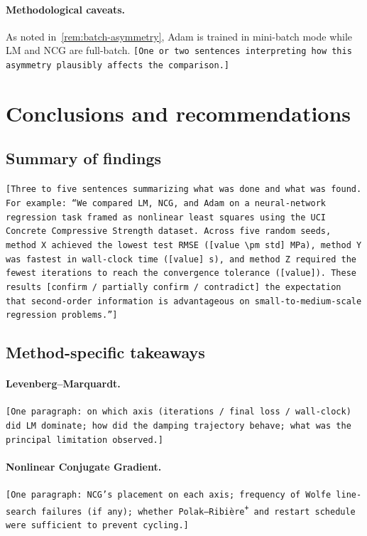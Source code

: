 \documentclass[11pt,letterpaper]{article}
\theoremstyle{definition}
\begin{document}
\paragraph{Methodological caveats.}
As noted in~\cref{rem:batch-asymmetry}, Adam is trained in mini-batch mode
while LM and NCG are full-batch. \texttt{[One or two sentences interpreting
how this asymmetry plausibly affects the comparison.]}
 
\section{Conclusions and recommendations}
\label{sec:conclusions}
 
\subsection{Summary of findings}
 
\texttt{[Three to five sentences summarizing what was done and what was
found. For example: ``We compared LM, NCG, and Adam on a neural-network
regression task framed as nonlinear least squares using the UCI Concrete
Compressive Strength dataset. Across five random seeds, \emph{method X}
achieved the lowest test RMSE (\texttt{[value $\pm$ std]} MPa),
\emph{method Y} was fastest in wall-clock time (\texttt{[value]} s), and
\emph{method Z} required the fewest iterations to reach the convergence
tolerance (\texttt{[value]}). These results [confirm / partially confirm /
contradict] the expectation that second-order information is advantageous
on small-to-medium-scale regression problems.'']}
 
\subsection{Method-specific takeaways}
 
\paragraph{Levenberg--Marquardt.}
\texttt{[One paragraph: on which axis (iterations / final loss /
wall-clock) did LM dominate; how did the damping trajectory behave; what
was the principal limitation observed.]}
 
\paragraph{Nonlinear Conjugate Gradient.}
\texttt{[One paragraph: NCG's placement on each axis; frequency of Wolfe
line-search failures (if any); whether Polak--Ribière\textsuperscript{+}
and restart schedule were sufficient to prevent cycling.]}
 
\end{document}
